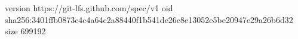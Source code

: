 version https://git-lfs.github.com/spec/v1
oid sha256:3401ffb0873c4c4a64c2a88440f1b541de26c8e13052e5be20947e29a26b6d32
size 699192
